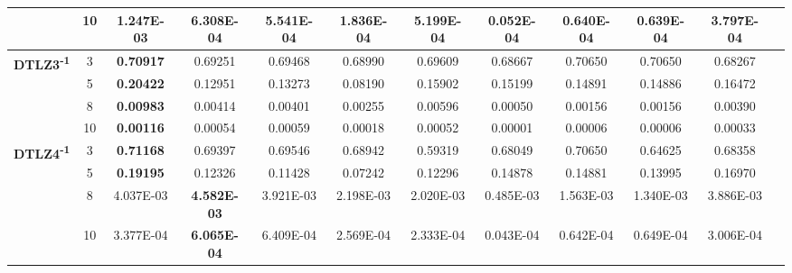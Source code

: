 \documentclass{sig-alternate}
\begin{document}
\begin{table}[!htb]
\begin{tabular}{|c|c|c|c|c|c|c|c|c|c|c|c|}
                                                      & 10         & \textbf{1.247E-03} & 6.308E-04          & 5.541E-04             & 1.836E-04        & 5.199E-04           & 0.052E-04           & 0.640E-04          & 0.639E-04            & 3.797E-04          \\ \hline
\multirow{4}{*}{\textbf{DTLZ3\textsuperscript{-1}}} & 3          & \textbf{0.70917}   & 0.69251            & 0.69468               & 0.68990          & 0.69609             & 0.68667             & 0.70650            & 0.70650              & 0.68267            \\ \cline{2-11} 
                                                      & 5          & \textbf{0.20422}   & 0.12951            & 0.13273               & 0.08190          & 0.15902             & 0.15199             & 0.14891            & 0.14886              & 0.16472            \\ \cline{2-11} 
                                                      & 8          & \textbf{0.00983}   & 0.00414            & 0.00401               & 0.00255          & 0.00596             & 0.00050             & 0.00156            & 0.00156              & 0.00390            \\ \cline{2-11} 
                                                      & 10         & \textbf{0.00116}   & 0.00054            & 0.00059               & 0.00018          & 0.00052             & 0.00001             & 0.00006            & 0.00006              & 0.00033            \\ \hline
\multirow{4}{*}{\textbf{DTLZ4\textsuperscript{-1}}} & 3          & \textbf{0.71168}   & 0.69397            & 0.69546               & 0.68942          & 0.59319             & 0.68049             & 0.70650            & 0.64625              & 0.68358            \\ \cline{2-11} 
                                                      & 5          & \textbf{0.19195}   & 0.12326            & 0.11428               & 0.07242          & 0.12296             & 0.14878             & 0.14881            & 0.13995              & 0.16970            \\ \cline{2-11} 
                                                      & 8          & 4.037E-03          & \textbf{4.582E-03} & 3.921E-03             & 2.198E-03        & 2.020E-03           & 0.485E-03           & 1.563E-03          & 1.340E-03            & 3.886E-03          \\ \cline{2-11} 
                                                      & 10         & 3.377E-04          & \textbf{6.065E-04} & 6.409E-04             & 2.569E-04        & 2.333E-04           & 0.043E-04           & 0.642E-04          & 0.649E-04            & 3.006E-04          \\ \hline

\end{tabular}
\end{table}
\end{document}
